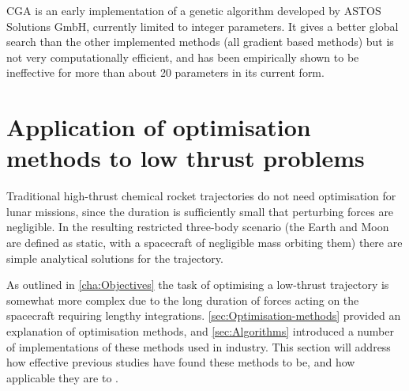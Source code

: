 CGA \parencite[Constrained Genetic Algorithm, ][]{ASTOS_guide} is an early implementation of a genetic algorithm developed by ASTOS Solutions GmbH, currently limited to integer parameters. It gives a better global search than the other implemented methods (all gradient based methods) but is not very computationally efficient, and has been empirically shown to be ineffective for more than about 20 parameters in its current form.




\section{Application of optimisation methods to low thrust problems} \label{sec:Low-thrust}




Traditional high-thrust chemical rocket trajectories do not need optimisation for lunar missions, since the duration is sufficiently small that perturbing forces are negligible. In the resulting restricted three-body scenario (the Earth and Moon are defined as static, with a spacecraft of negligible mass orbiting them) there are simple analytical solutions for the trajectory.

As outlined in \autoref{cha:Objectives} the task of optimising a low-thrust trajectory is somewhat more complex due to the long duration of forces acting on the spacecraft requiring lengthy integrations. %
\autoref{sec:Optimisation-methods} provided an explanation of optimisation methods, and \autoref{sec:Algorithms} introduced a number of implementations of these methods used in industry.
This section will address how effective previous studies have found these methods to be, and how applicable they are to \BW.

